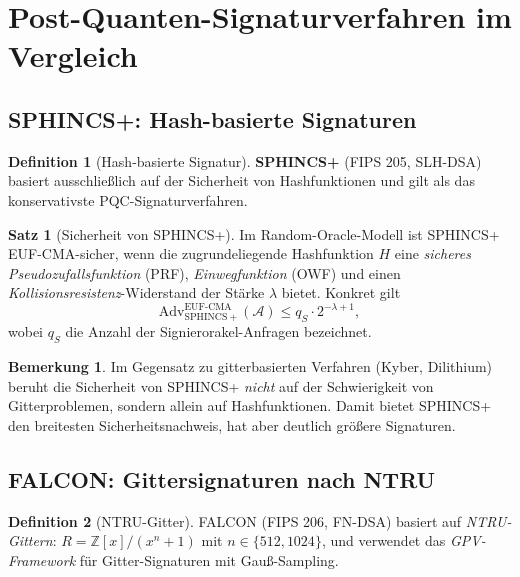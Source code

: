 ﻿\documentclass[a4paper,12pt]{article}
\theoremstyle{definition}
\newtheorem{definition}{Definition}[section]
\newtheorem{bemerkung}{Bemerkung}[section]
\newtheorem{satz}{Satz}[section]
\begin{document}
\section{Post-Quanten-Signaturverfahren im Vergleich}

\subsection{SPHINCS+: Hash-basierte Signaturen}

\begin{definition}[Hash-basierte Signatur]
\textbf{SPHINCS+} \cite{HBD+22} (FIPS 205, SLH-DSA) basiert ausschließlich
auf der Sicherheit von Hashfunktionen und gilt als das konservativste PQC-Signaturverfahren.
\end{definition}

\begin{satz}[Sicherheit von SPHINCS+]
Im Random-Oracle-Modell ist SPHINCS+ EUF-CMA-sicher, wenn die zugrundeliegende
Hashfunktion $H$ eine \emph{sicheres Pseudozufallsfunktion} (PRF),
\emph{Einwegfunktion} (OWF) und einen \emph{Kollisionsresistenz}-Widerstand
der Stärke $\lambda$ bietet. Konkret gilt
\[
  \mathrm{Adv}^{\mathrm{EUF\text{-}CMA}}_{\mathrm{SPHINCS+}}(\mathcal{A})
  \leq q_S \cdot 2^{-\lambda + 1},
\]
wobei $q_S$ die Anzahl der Signierorakel-Anfragen bezeichnet.
\end{satz}

\begin{bemerkung}
Im Gegensatz zu gitterbasierten Verfahren (Kyber, Dilithium) beruht die
Sicherheit von SPHINCS+ \emph{nicht} auf der Schwierigkeit von Gitterproblemen,
sondern allein auf Hashfunktionen. Damit bietet SPHINCS+ den breitesten
Sicherheitsnachweis, hat aber deutlich größere Signaturen.
\end{bemerkung}

\subsection{FALCON: Gittersignaturen nach NTRU}

\begin{definition}[NTRU-Gitter]
FALCON \cite{PFH+22} (FIPS 206, FN-DSA) basiert auf \emph{NTRU-Gittern}:
$R = \mathbb{Z}[x]/(x^n+1)$ mit $n \in \{512, 1024\}$,
und verwendet das \emph{GPV-Framework} \cite{GPV08} für Gitter-Signaturen
mit Gauß-Sampling.
\end{definition}
\end{document}
